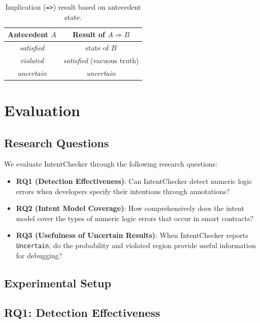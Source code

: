 \documentclass[pdflatex,sn-basic]{sn-jnl}%
\theoremstyle{thmstyleone}%
\theoremstyle{thmstyletwo}%
\theoremstyle{thmstylethree}%
\begin{document}
\begin{table}[t]
\centering
\caption{Implication (\texttt{=>}) result based on antecedent state.}
\label{tab:implication}
\small
\begin{tabular}{c|c}
\toprule
Antecedent $A$ & Result of $A \Rightarrow B$ \\
\midrule
\textit{satisfied} & state of $B$ \\
\textit{violated} & \textit{satisfied} (vacuous truth) \\
\textit{uncertain} & \textit{uncertain} \\
\bottomrule
\end{tabular}
\end{table}

\section{Evaluation}\label{sec:evaluation}

\subsection{Research Questions}

We evaluate IntentChecker through the following research questions:

\begin{itemize}
    \item \textbf{RQ1 (Detection Effectiveness)}: Can IntentChecker detect numeric logic errors when developers specify their intentions through annotations?
    \item \textbf{RQ2 (Intent Model Coverage)}: How comprehensively does the intent model cover the types of numeric logic errors that occur in smart contracts?
    \item \textbf{RQ3 (Usefulness of Uncertain Results)}: When IntentChecker reports \texttt{Uncertain}, do the probability and violated region provide useful information for debugging?
\end{itemize}

\subsection{Experimental Setup}


\subsection{RQ1: Detection Effectiveness}
\end{document}
